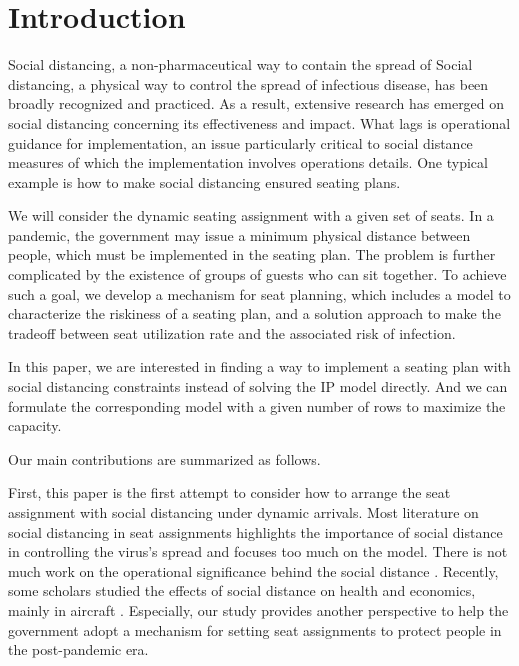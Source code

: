 \section{Introduction}

Social distancing, a non-pharmaceutical way to contain the spread of Social distancing, a physical way to control the spread of infectious disease, has been broadly recognized and practiced. As a result, extensive research has emerged on social distancing concerning its effectiveness and impact. What lags is operational guidance for implementation, an issue particularly critical to social distance measures of which the implementation involves operations details. One typical example is how to make social distancing ensured seating plans.

We will consider the dynamic seating assignment with a given set of seats. In a pandemic, the government may issue a minimum physical distance between people, which must be implemented in the seating plan. The problem is further complicated by the existence of groups of guests who can sit together. To achieve such a goal, we develop a mechanism for seat planning, which includes a model to characterize the riskiness of a seating plan, and a solution approach to make the tradeoff between seat utilization rate and the associated risk of infection.

In this paper, we are interested in finding a way to implement a seating plan with social distancing constraints instead of solving the IP model directly. 
And we can formulate the corresponding model with a given number of rows to maximize the capacity.


Our main contributions are summarized as follows.

First, this paper is the first attempt to consider how to arrange the seat assignment with social distancing under dynamic arrivals. 
Most literature on social distancing in seat assignments highlights the importance of social distance in controlling the virus's spread and focuses too much on the model. There is not much work on the operational significance behind the social distance \cite{barry2021optimal} \cite{fischetti2021safe}.
Recently, some scholars studied the effects of social distance on health and economics, mainly in aircraft \cite{salari2020social} \cite{ghorbani2020model}. Especially, our study provides another perspective to help the government adopt a mechanism for setting seat assignments to protect people 
in the post-pandemic era.

